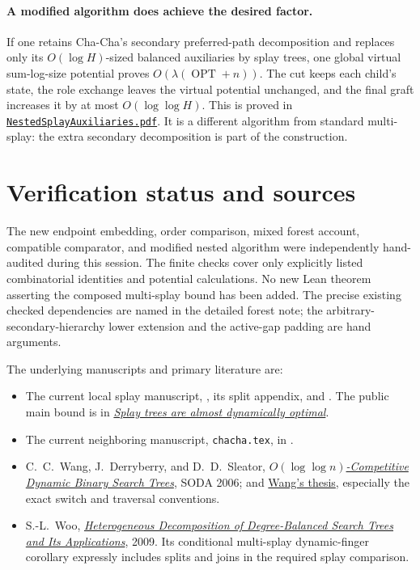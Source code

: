 \documentclass[11pt]{article}
\newcommand{\OPT}{\operatorname{OPT}}
\begin{document}
\paragraph{A modified algorithm does achieve the desired factor.}
If one retains Cha-Cha's secondary preferred-path decomposition
and replaces only its $O(\log H)$-sized balanced auxiliaries by splay
trees, one global virtual sum-log-size potential proves
$O(\lambda(\OPT+n))$. The cut keeps each child's state, the role
exchange leaves the virtual potential unchanged, and the final graft
increases it by at most $O(\log\log H)$. This is proved in
\href{NestedSplayAuxiliaries.pdf}{\texttt{NestedSplayAuxiliaries.pdf}}.
It is a different algorithm from standard multi-splay: the extra
secondary decomposition is part of the construction.

\section{Verification status and sources}

The new endpoint embedding, order comparison, mixed forest account,
compatible comparator, and modified nested algorithm were independently
hand-audited during this session. The finite checks cover only explicitly
listed combinatorial identities and potential calculations. No new
Lean theorem asserting the composed multi-splay bound has been added.
The precise existing checked dependencies are named in the detailed
forest note; the arbitrary-secondary-hierarchy lower extension and
the active-gap padding are hand arguments.

The underlying manuscripts and primary literature are:
\begin{itemize}
\item The current local splay manuscript, , its
split appendix, and .
The public main bound is in
\href{https://arxiv.org/abs/2607.18498}{\emph{Splay trees are almost dynamically optimal}}.
\item The current neighboring manuscript, \texttt{chacha.tex},
in .
\item C.~C.~Wang, J.~Derryberry, and D.~D.~Sleator,
\href{https://www.cs.cmu.edu/~jonderry/multi-splay.pdf}{\emph{$O(\log\log n)$-Competitive Dynamic Binary Search Trees}}, SODA 2006;
and \href{https://www.csd.cmu.edu/sites/default/files/phd-thesis/CMU-CS-06-140.pdf}{Wang's thesis}, especially the exact switch and traversal conventions.
\item S.-L.~Woo,
\href{https://csd.cs.cmu.edu/sites/default/files/phd-thesis/CMU-CS-09-133.pdf}{\emph{Heterogeneous Decomposition of Degree-Balanced Search Trees and Its Applications}}, 2009.
Its conditional multi-splay dynamic-finger corollary expressly includes
splits and joins in the required splay comparison.
\end{itemize}
\end{document}
